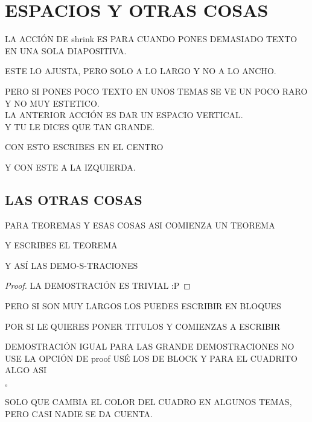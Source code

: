 \documentclass[11pt]{beamer}
\begin{document}
\section{ESPACIOS Y OTRAS COSAS}
\begin{frame}[shrink]
LA ACCIÓN DE  shrink ES PARA CUANDO PONES DEMASIADO TEXTO EN UNA SOLA DIAPOSITIVA.\

ESTE LO AJUSTA, PERO SOLO A LO LARGO Y NO A LO ANCHO. \

PERO SI PONES POCO TEXTO EN UNOS TEMAS SE VE UN POCO RARO Y NO MUY ESTETICO.\\
\vspace{3mm}
LA ANTERIOR ACCIÓN ES DAR UN ESPACIO VERTICAL.\\
\vspace{4mm}
Y TU LE DICES QUE TAN GRANDE.
\begin{center}
CON ESTO ESCRIBES EN EL CENTRO
\end{center}
\begin{flushright}
Y CON ESTE A LA IZQUIERDA.
\end{flushright}
\end{frame}

\subsection{LAS OTRAS COSAS}
\begin{frame}{PARA TEOREMAS Y ESAS COSAS}
ASI COMIENZA UN TEOREMA
\begin{theorem}
Y ESCRIBES EL TEOREMA
\end{theorem}
Y ASÍ LAS DEMO-S-TRACIONES
\begin{proof}
LA DEMOSTRACIÓN ES TRIVIAL :P
\end{proof}
\end{frame}

\begin{frame}
PERO SI SON MUY LARGOS LOS PUEDES ESCRIBIR EN BLOQUES
\begin{block}{POR SI LE QUIERES PONER TITULOS}
Y COMIENZAS A ESCRIBIR
\end{block}
\begin{block}{DEMOSTRACIÓN}
IGUAL PARA LAS GRANDE DEMOSTRACIONES NO USE LA OPCIÓN DE proof USÉ LOS DE BLOCK Y PARA EL CUADRITO ALGO ASI
\begin{flushright}
$\square$
\end{flushright}
\end{block}
SOLO QUE CAMBIA EL COLOR DEL CUADRO EN ALGUNOS TEMAS, PERO CASI NADIE SE DA CUENTA.
\end{frame}
\end{document}
